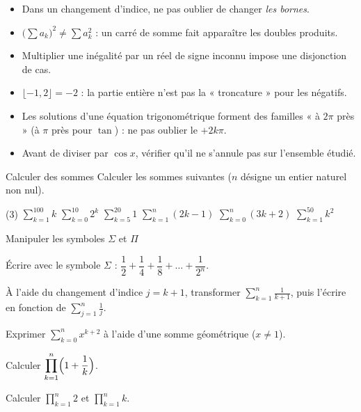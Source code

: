 \begin{attention}
\begin{itemize}[label={\color{otOrange}\textbullet},leftmargin=1.4em,itemsep=0.6mm,topsep=0.5mm]
  \item Dans un changement d'indice, ne pas oublier de changer \emph{les bornes}.
  \item $\bigl(\sum a_k\bigr)^{2}\neq\sum a_k^{2}$ : un carré de somme fait apparaître les doubles produits.
  \item Multiplier une inégalité par un réel de signe inconnu impose une disjonction de cas.
  \item $\lfloor-1{,}2\rfloor=-2$ : la partie entière n'est pas la « troncature » pour les négatifs.
  \item Les solutions d'une équation trigonométrique forment des familles « à $2\pi$ près »
    (à $\pi$ près pour $\tan$) : ne pas oublier le $+2k\pi$.
  \item Avant de diviser par $\cos x$, vérifier qu'il ne s'annule pas sur l'ensemble étudié.
\end{itemize}
\end{attention}

\exercices
{}

\begin{exercice}[1]{Calculer des sommes}
Calculer les sommes suivantes ($n$ désigne un entier naturel non nul).
\begin{tasks}(3)
  \task $\displaystyle\sum_{k=1}^{100}k$
  \task $\displaystyle\sum_{k=0}^{10}2^{k}$
  \task $\displaystyle\sum_{k=5}^{20}1$
  \task $\displaystyle\sum_{k=1}^{n}(2k-1)$
  \task $\displaystyle\sum_{k=0}^{n}(3k+2)$
  \task $\displaystyle\sum_{k=1}^{50}k^{2}$
\end{tasks}
\end{exercice}

\begin{exercice}[1]{Manipuler les symboles $\Sigma$ et $\Pi$}
\begin{questions}
  \item Écrire avec le symbole $\Sigma$ : $\dfrac12+\dfrac14+\dfrac18+\dots+\dfrac{1}{2^{n}}$.
  \item À l'aide du changement d'indice $j=k+1$, transformer
    $\displaystyle\sum_{k=1}^{n}\frac{1}{k+1}$, puis l'écrire en fonction de
    $\displaystyle\sum_{j=1}^{n}\frac{1}{j}$.
  \item Exprimer $\displaystyle\sum_{k=0}^{n}x^{k+2}$ à l'aide d'une somme géométrique ($x\neq1$).
  \item Calculer $\displaystyle\prod_{k=1}^{n}\Bigl(1+\frac{1}{k}\Bigr)$.
  \item Calculer $\displaystyle\prod_{k=1}^{n}2$ et $\displaystyle\prod_{k=1}^{n}k$.
\end{questions}
\end{exercice}

